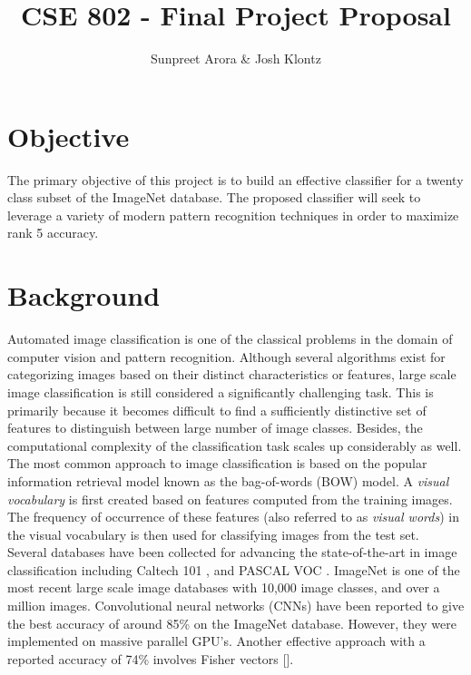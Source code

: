 \documentclass[12pt]{article}
\begin{document}
 
\title{CSE 802 - Final Project Proposal}
\author{Sunpreet Arora \& Josh Klontz\\
}
 
\maketitle

\section{Objective}
The primary objective of this project is to build an effective classifier for a twenty class subset of the ImageNet \cite{imagenet} database. The proposed classifier will seek to leverage a variety of modern pattern recognition techniques in order to maximize rank 5 accuracy.

\section{Background}
Automated image classification is one of the classical problems in the domain of computer vision and pattern recognition. Although several algorithms exist for categorizing images based on their distinct characteristics or features, large scale image classification is still considered a significantly challenging task. This is primarily because it becomes difficult to find a sufficiently distinctive set of features to distinguish between large number of image classes. Besides, the computational complexity of the classification task scales up considerably as well.\\

The most common approach to image classification is based on the popular information retrieval model known as the bag-of-words (BOW) model. A \textit{visual vocabulary} is first created based on features computed from the training images. The frequency of occurrence of these features (also referred to as \textit{visual words}) in the visual vocabulary is then used for classifying images from the test set.\\

Several databases have been collected for advancing the state-of-the-art in image classification including Caltech 101 \cite{caltech101}, and PASCAL VOC \cite{pascal09}. ImageNet\cite{imagenet} is one of the most recent large scale image databases with 10,000 image classes, and over a million images. Convolutional neural networks (CNNs) have been reported to give the best accuracy of around 85\% on the ImageNet database. However, they were implemented on massive parallel GPU's. Another effective approach with a reported accuracy of 74\% involves Fisher vectors [].
\end{document}
